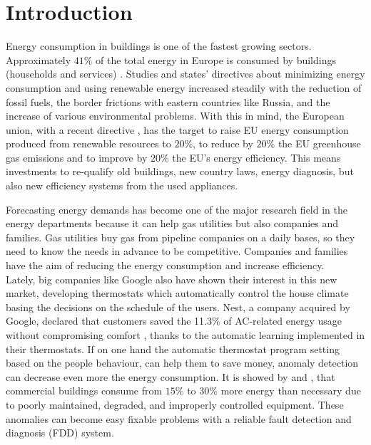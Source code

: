 \documentclass{sig-alternate-sigmod07}
\begin{document}

\section{Introduction}

Energy consumption in buildings is one of the fastest growing sectors. Approximately $41\%$ of the total energy in Europe is consumed by buildings (households and services) \cite{Eurostat2013}. Studies and states' directives about minimizing energy consumption and using renewable energy increased steadily with the reduction of fossil fuels, the border frictions with eastern countries like Russia, and the increase of various environmental problems. With this in mind, the European union, with a recent directive \cite{Directive2009}, has the target to raise EU energy consumption produced from renewable resources to $20\%$, to reduce by $20\%$ the EU greenhouse gas emissions and to improve by $20\%$ the EU's energy efficiency. This means investments to re-qualify old buildings, new country laws, energy diagnosis, but also new efficiency systems from the used appliances.

Forecasting energy demands has become one of the major research field in the energy departments because it can help gas utilities but also companies and families. Gas utilities buy gas from pipeline companies on a daily bases, so they need to know the needs in advance to be competitive.  Companies and families have the aim of reducing the energy consumption and increase efficiency. \\
Lately, big companies like Google also have shown their interest in this new market, developing thermostats which automatically control the house climate basing the decisions on the schedule of the users. Nest, a company acquired by Google, declared that customers saved the 11.3\% of AC-related energy usage without compromising comfort \cite{GoogleNest2}, thanks to the automatic learning implemented in their thermostats. If on one hand the automatic thermostat program setting based on the people behaviour, can help them to save money, anomaly detection can decrease even more the energy consumption. It is showed by \cite{katipamula2005review} and \cite{wu2011cross}, that commercial buildings consume from $15\%$ to $30\%$ more energy than necessary due to poorly maintained, degraded, and improperly controlled equipment. These anomalies can become easy fixable problems with a reliable fault detection and diagnosis (FDD) system. 
\end{document}
